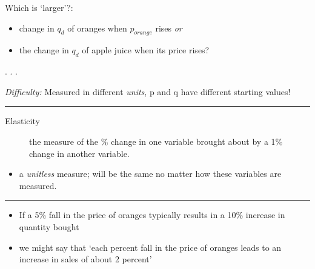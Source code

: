 \documentclass[]{article}
\providecommand{\tightlist}{%
  \setlength{\itemsep}{0pt}\setlength{\parskip}{0pt}}
\begin{document}
Which is `larger'?:

\begin{itemize}
\item
  change in \(q_d\) of oranges when \(p_{orange}\) rises \emph{or}
\item
  the change in \(q_d\) of apple juice when its price rises?
\end{itemize}


. . .

\emph{Difficulty:} Measured in different \emph{units}, p and q have
different starting values!

\begin{center}\rule{0.5\linewidth}{\linethickness}\end{center}

\begin{description}
\item[Elasticity]
the measure of the \% change in one variable brought about by a 1\%
change in another variable.
\end{description}

\begin{itemize}
\tightlist
\item
  a \emph{unitless} measure; will be the same no matter how these
  variables are measured.
\end{itemize}


\begin{center}\rule{0.5\linewidth}{\linethickness}\end{center}

\begin{itemize}
\item
  If a 5\% fall in the price of oranges typically results in a 10\%
  increase in quantity bought
\item
  we might say that `each percent fall in the price of oranges leads to
  an increase in sales of about 2 percent'
\end{itemize}
\end{document}
